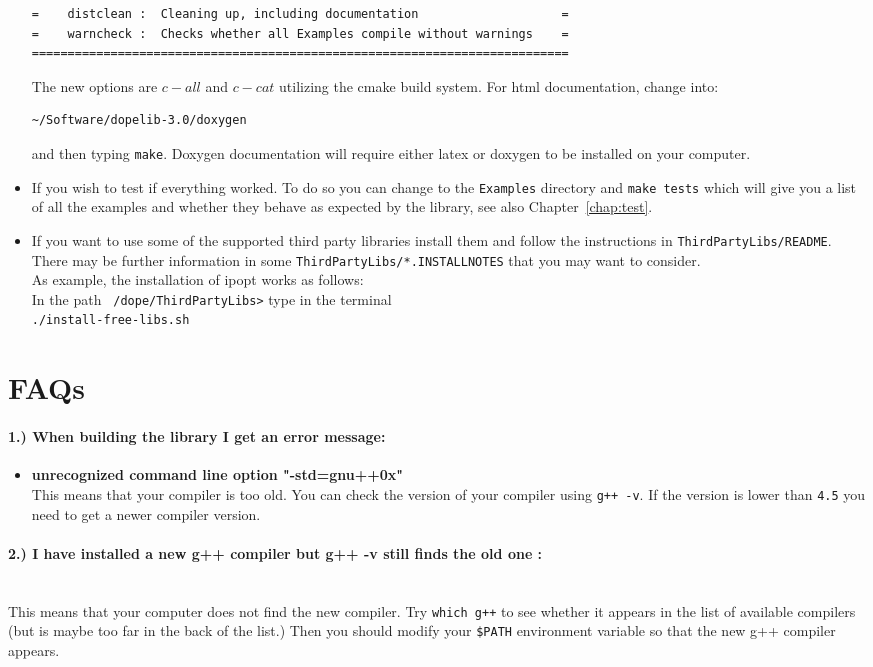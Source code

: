 \begin{itemize}
{\begin{lstlisting}
=    distclean :  Cleaning up, including documentation                    =
=    warncheck :  Checks whether all Examples compile without warnings    =
===========================================================================
\end{lstlisting}
}
The new options are $c-all$ and $c-cat$ utilizing the cmake build system.
For html documentation, change into:
\begin{lstlisting}
~/Software/dopelib-3.0/doxygen
\end{lstlisting}
and then typing \texttt{make}. Doxygen documentation
will require either 
latex or doxygen to be installed on your computer.
\item If you wish to test if everything worked. To do so you can 
change to the \texttt{Examples} directory and \texttt{make tests} which will give you a 
list of all the examples and whether they behave as expected by the library, see also 
Chapter~\ref{chap:test}.
\item  If you want to use some of the supported third party libraries install them and follow 
 the instructions in \texttt{ThirdPartyLibs/README}. There may be further information 
 in some \texttt{ThirdPartyLibs/*.INSTALLNOTES} that you may want to
 consider.\\[3mm]
 As example, the installation of ipopt works as follows:\\
In the path \texttt{~/dope/ThirdPartyLibs>} type in the terminal\\
\texttt{./install-free-libs.sh}


\end{itemize}
\section{FAQs}
\paragraph{1.) When building the library I get an error message:}
\begin{itemize}
\item \textbf{unrecognized command line option "-std=gnu++0x"}\\
  This means that your compiler is too old. You can check the 
  version of your compiler using \texttt{g++ -v}. If the version is lower than
  \texttt{4.5} you need to get a newer compiler version.
\end{itemize}

\paragraph{2.) I have installed a new g++ compiler but g++ -v still finds the old one :}
\ \\
  This means that your computer does not find the new compiler. Try
  \texttt{which g++} to see whether it appears in the list of available 
  compilers (but is maybe too far in the back of the list.) Then you should 
  modify your \texttt{\$PATH} environment variable so that the new g++ compiler
  appears.

